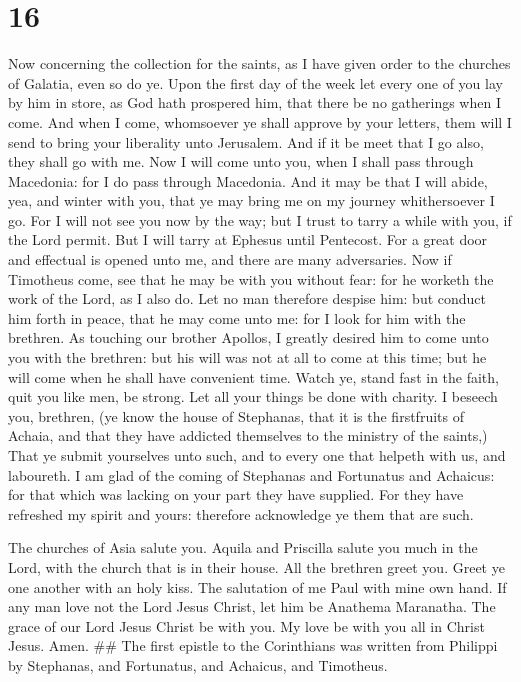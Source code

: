 \hypertarget{section-15}{%
\section{16}\label{section-15}}

 Now concerning the collection for the saints, as I have
given order to the churches of Galatia, even so do ye.  Upon
the first day of the week let every one of you lay by him in store, as
God hath prospered him, that there be no gatherings when I come.
 And when I come, whomsoever ye shall approve by your
letters, them will I send to bring your liberality unto Jerusalem.
 And if it be meet that I go also, they shall go with me.
 Now I will come unto you, when I shall pass through
Macedonia: for I do pass through Macedonia.  And it may be
that I will abide, yea, and winter with you, that ye may bring me on my
journey whithersoever I go.  For I will not see you now by
the way; but I trust to tarry a while with you, if the Lord permit.
 But I will tarry at Ephesus until Pentecost. 
For a great door and effectual is opened unto me, and there are many
adversaries.  Now if Timotheus come, see that he may be
with you without fear: for he worketh the work of the Lord, as I also
do.  Let no man therefore despise him: but conduct him
forth in peace, that he may come unto me: for I look for him with the
brethren.  As touching our brother Apollos, I greatly
desired him to come unto you with the brethren: but his will was not at
all to come at this time; but he will come when he shall have convenient
time.  Watch ye, stand fast in the faith, quit you like
men, be strong.  Let all your things be done with charity.
 I beseech you, brethren, (ye know the house of Stephanas,
that it is the firstfruits of Achaia, and that they have addicted
themselves to the ministry of the saints,)  That ye submit
yourselves unto such, and to every one that helpeth with us, and
laboureth.  I am glad of the coming of Stephanas and
Fortunatus and Achaicus: for that which was lacking on your part they
have supplied.  For they have refreshed my spirit and
yours: therefore acknowledge ye them that are such.

 The churches of Asia salute you. Aquila and Priscilla
salute you much in the Lord, with the church that is in their house.
 All the brethren greet you. Greet ye one another with an
holy kiss.  The salutation of me Paul with mine own hand.
 If any man love not the Lord Jesus Christ, let him be
Anathema Maranatha.  The grace of our Lord Jesus Christ be
with you.  My love be with you all in Christ Jesus. Amen.
\#\# The first epistle to the Corinthians was written from Philippi by
Stephanas, and Fortunatus, and Achaicus, and Timotheus.

